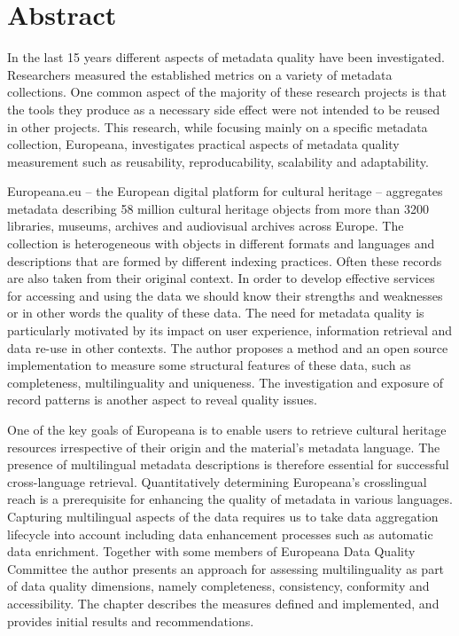 \chapter*{Abstract}

In the last 15 years different aspects of  metadata quality have been investigated. Researchers measured the established metrics on a variety of metadata collections. One common aspect of the majority of these research projects is that the tools they produce as a necessary side effect were not intended to be reused in other projects. This research, while focusing mainly on a specific metadata collection, Europeana, investigates  practical aspects of metadata quality measurement such as reusability, reproducability, scalability and adaptability.

Europeana.eu -- the European digital platform for cultural heritage -- aggregates metadata describing 58 million cultural heritage objects from more than 3200 libraries, museums, archives and audiovisual archives across Europe. The collection is heterogeneous with objects in different formats and languages and descriptions that are formed by different indexing practices. Often these records are also taken from their original context. In order to develop effective services for accessing and using the data we should know their strengths and weaknesses or in other words the quality of these data. The need for metadata quality is particularly motivated by its impact on user experience, information retrieval and data re-use in other contexts. The author proposes a method and an open source implementation to measure some structural features of these data, such as completeness, multilinguality and uniqueness. The investigation and exposure of record patterns is another aspect to reveal quality issues.

One of the key goals of Europeana is to enable users to retrieve cultural heritage resources irrespective of their origin and the material’s metadata language. The presence of multilingual metadata descriptions is therefore essential for successful cross-language retrieval. Quantitatively determining Europeana’s crosslingual reach is a prerequisite for enhancing the quality of metadata in various languages. Capturing multilingual aspects of the data requires us to take data aggregation lifecycle into account including data enhancement processes such as automatic data enrichment. Together with some members of Europeana Data Quality Committee the author presents an approach for assessing multilinguality as part of data quality dimensions, namely completeness, consistency, conformity and accessibility. The chapter describes the measures defined and implemented, and provides initial results and recommendations.

